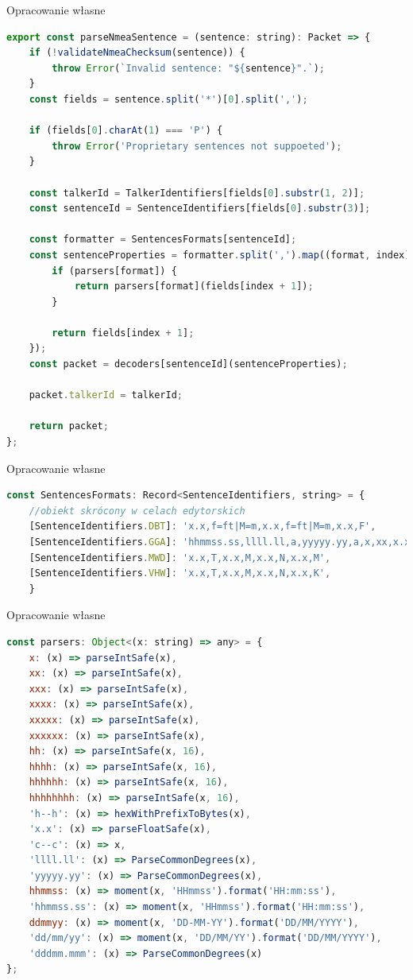 \documentclass[skorowidz,skroty]{dyplomWEZUT}
\begin{document}
{Opracowanie własne}{\label{code: parseNmeaSentence}}
\begin{lstlisting}[language=JavaScript]
export const parseNmeaSentence = (sentence: string): Packet => {
    if (!validateNmeaChecksum(sentence)) {
        throw Error(`Invalid sentence: "${sentence}".`);
    }
    const fields = sentence.split('*')[0].split(',');

    if (fields[0].charAt(1) === 'P') {
        throw Error('Proprietary sentences not suppoeted');
    }

    const talkerId = TalkerIdentifiers[fields[0].substr(1, 2)];
    const sentenceId = SentenceIdentifiers[fields[0].substr(3)];

    const formatter = SentencesFormats[sentenceId];
    const sentenceProperties = formatter.split(',').map((format, index) => {
        if (parsers[format]) {
            return parsers[format](fields[index + 1]);
        }

        return fields[index + 1];
    });
    const packet = decoders[sentenceId](sentenceProperties);

    packet.talkerId = talkerId;

    return packet;
};
\end{lstlisting}

{Opracowanie własne}{\label{code: SentencesFormats}}
\begin{lstlisting}[language=JavaScript]
const SentencesFormats: Record<SentenceIdentifiers, string> = {
	//obiekt skrócony w celach edytorskich
	[SentenceIdentifiers.DBT]: 'x.x,f=ft|M=m,x.x,f=ft|M=m,x.x,F',
	[SentenceIdentifiers.GGA]: 'hhmmss.ss,llll.ll,a,yyyyy.yy,a,x,xx,x.x,x.x,M,x.x,M,x.x,xxxx',
 	[SentenceIdentifiers.MWD]: 'x.x,T,x.x,M,x.x,N,x.x,M',
    [SentenceIdentifiers.VHW]: 'x.x,T,x.x,M,x.x,N,x.x,K',
    }
\end{lstlisting}

{Opracowanie własne}{\label{code: parsers mapper}}
\begin{lstlisting}[language=JavaScript]
const parsers: Object<(x: string) => any> = {
    x: (x) => parseIntSafe(x),
    xx: (x) => parseIntSafe(x),
    xxx: (x) => parseIntSafe(x),
    xxxx: (x) => parseIntSafe(x),
    xxxxx: (x) => parseIntSafe(x),
    xxxxxx: (x) => parseIntSafe(x),
    hh: (x) => parseIntSafe(x, 16),
    hhhh: (x) => parseIntSafe(x, 16),
    hhhhhh: (x) => parseIntSafe(x, 16),
    hhhhhhhh: (x) => parseIntSafe(x, 16),
    'h--h': (x) => hexWithPrefixToBytes(x),
    'x.x': (x) => parseFloatSafe(x),
    'c--c': (x) => x,
    'llll.ll': (x) => ParseCommonDegrees(x),
    'yyyyy.yy': (x) => ParseCommonDegrees(x),
    hhmmss: (x) => moment(x, 'HHmmss').format('HH:mm:ss'),
    'hhmmss.ss': (x) => moment(x, 'HHmmss').format('HH:mm:ss'),
    ddmmyy: (x) => moment(x, 'DD-MM-YY').format('DD/MM/YYYY'),
    'dd/mm/yy': (x) => moment(x, 'DD/MM/YY').format('DD/MM/YYYY'),
    'dddmm.mmm': (x) => ParseCommonDegrees(x)
};
\end{lstlisting}
\end{document}
